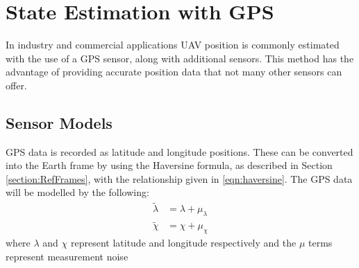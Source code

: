 \section{State Estimation with GPS}\label{section:GPS_EKF}
In industry and commercial applications UAV position is commonly estimated with the use of a GPS sensor, along with additional sensors. This method has the advantage of providing accurate position data that not many other sensors can offer.

\subsection{Sensor Models}\label{section:GPS_sensorModels}
GPS data is recorded as latitude and longitude positions. These can be converted into the Earth frame by using the Haversine formula, as described in Section \ref{section:RefFrames}, with the relationship given in \eqref{eqn:haversine}. The GPS data will be modelled by the following:
\begin{equation}
\begin{split}
\tilde{\lambda}&=\lambda+\mu_{\lambda}\\
\tilde{\chi}&=\chi +\mu_{\chi}
\end{split}
\end{equation}
where $\lambda$ and $\chi$ represent latitude and longitude respectively and the $\mu$ terms represent measurement noise

